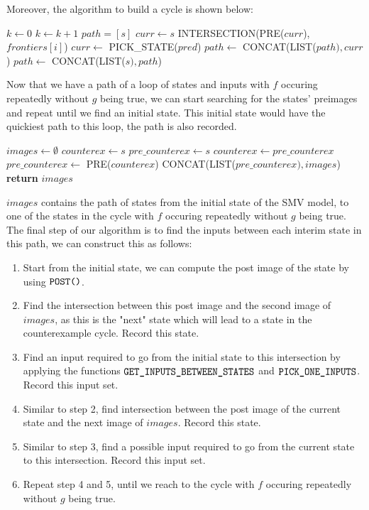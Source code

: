 \newpage 
Moreover, the algorithm to build a cycle is shown below:

\begin{algorithmic}[1]
\State $k \leftarrow 0$
    \State $k \leftarrow k+1$
\EndWhile    
\State
\State $path = [s]$
\State $curr \leftarrow s$
    \State INTERSECTION(PRE($curr$), $frontiers[i]$)
    \State $curr \leftarrow$ PICK\_STATE($pred$)
    \State $path \leftarrow$ CONCAT(LIST($path),curr$)
\EndFor
\State $path \leftarrow$ CONCAT(LIST($s), path$)
\end{algorithmic}
\medskip

Now that we have a path of a loop of states and inputs with $f$ occuring repeatedly without $g$ being true, we can start searching for the states' preimages and repeat until we find an initial state. This initial state would have the quickiest path to this loop, the path is also recorded.

\begin{algorithmic}[1]
\State $images \leftarrow \emptyset$
\State $counterex \leftarrow s$
\State $pre\_counterex \leftarrow s$
    \State $counterex \leftarrow pre\_counterex$
    \State $pre\_counterex \leftarrow$ PRE($counterex$)
    \State CONCAT(LIST($pre\_counterex), images$)
\EndWhile
\State \textbf{return} $images$
\EndFunction
\end{algorithmic}
\medskip

$images$ contains the path of states from the initial state of the SMV model, to one of the states in the cycle with $f$ occuring repeatedly without $g$ being true. The final step of our algorithm is to find the inputs between each interim state in this path, we can construct this as follows:

\begin{enumerate}
    \item Start from the initial state, we can compute the post image of the state by using $\verb|POST()|$.
    \item Find the intersection between this post image and the second image of $images$, as this is the "next" state which will lead to a state in the counterexample cycle. Record this state.
    \item Find an input required to go from the initial state to this intersection by applying the functions $\verb|GET_INPUTS_BETWEEN_STATES|$ and $\verb|PICK_ONE_INPUTS|$. Record this input set.
    \item Similar to step 2, find intersection between the post image of the current state and the next image of $images$. Record this state.
    \item Similar to step 3, find a possible input required to go from the current state to this intersection. Record this input set.
    \item Repeat step 4 and 5, until we reach to the cycle with $f$ occuring repeatedly without $g$ being true.
\end{enumerate}

